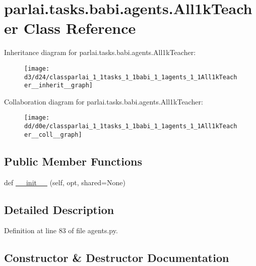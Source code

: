 \hypertarget{classparlai_1_1tasks_1_1babi_1_1agents_1_1All1kTeacher}{}\section{parlai.\+tasks.\+babi.\+agents.\+All1k\+Teacher Class Reference}
\label{classparlai_1_1tasks_1_1babi_1_1agents_1_1All1kTeacher}


Inheritance diagram for parlai.\+tasks.\+babi.\+agents.\+All1k\+Teacher\+:\nopagebreak
\begin{figure}[H]
\begin{center}
\leavevmode
\texttt{[image: d3/d24/classparlai\_1\_1tasks\_1\_1babi\_1\_1agents\_1\_1All1kTeacher\_\_inherit\_\_graph]}
\end{center}
\end{figure}


Collaboration diagram for parlai.\+tasks.\+babi.\+agents.\+All1k\+Teacher\+:\nopagebreak
\begin{figure}[H]
\begin{center}
\leavevmode
\texttt{[image: dd/d0e/classparlai\_1\_1tasks\_1\_1babi\_1\_1agents\_1\_1All1kTeacher\_\_coll\_\_graph]}
\end{center}
\end{figure}
\subsection*{Public Member Functions}
\begin{DoxyCompactItemize}
\item 
def \hyperlink{classparlai_1_1tasks_1_1babi_1_1agents_1_1All1kTeacher_ac78e7e860aad7926474025863ea9be4e}{\+\_\+\+\_\+init\+\_\+\+\_\+} (self, opt, shared=None)
\end{DoxyCompactItemize}


\subsection{Detailed Description}


Definition at line 83 of file agents.\+py.



\subsection{Constructor \& Destructor Documentation}
\mbox{\label{classparlai_1_1tasks_1_1babi_1_1agents_1_1All1kTeacher_ac78e7e860aad7926474025863ea9be4e}} 
